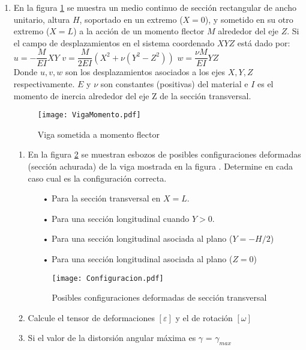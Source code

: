 \documentclass[../notas medios.tex]{subfiles}
\begin{document}
\begin{enumerate}
\item  \label{punto05_d}  En la figura \cref{VigaMomentoflec} se muestra un medio continuo de sección rectangular de ancho unitario, altura $H$, soportado en un extremo ($X = 0$), y sometido en su otro extremo ($X = L$) a la acci\'on de un momento flector $M$ alrededor del eje $Z$. Si el campo de desplazamientos en el sistema coordenado $XYZ$ est\'a dado por: \\

	$u= -\dfrac{M}{EI} X Y $ \hspace*{10mm}	
	$v= \dfrac{M}{2EI}(X^2+ \nu (Y^2-Z^2)) $ \hspace*{10mm}	
	$w= \dfrac{\nu M}{EI} Y Z  $\\


Donde $u,v,w$ son los desplazamientos asociados a los ejes $X,Y,Z$ 
respectivamente. $E$ y $\nu$ son constantes  (positivas) del material e $I$ es 
el momento de inercia alrededor del eje Z de la sección transversal. \\ 
\begin{figure}[H]
	\centering
	\texttt{[image: VigaMomento.pdf]}
	\caption{Viga sometida a momento flector}
	 \label{VigaMomentoflec}
\end{figure}
%
\begin{enumerate}
\item En la figura \cref{ConfiguraFlector} se muestran esbozos de posibles 
configuraciones deformadas (sección achurada) de la viga mostrada en la figura 
\label{VigaMomento}. Determine en cada caso cual es la configuración correcta. 
%
\begin{enumerate}
%
	\item[•] Para la sección transversal en $X = L$. 
	\item[•] Para una sección longitudinal cuando $Y > 0$.
	\item[•]  Para una sección longitudinal asociada al plano ($Y = -H/2$)
	\item[•]  Para una sección longitudinal asociada al plano ($Z = 0$) 
%
\end{enumerate}
%
\begin{figure}[H]
	\centering
	\texttt{[image: Configuracion.pdf]}
	\caption{Posibles configuraciones deformadas de sección transversal}
	\label{ConfiguraFlector}
\end{figure}
%
\item Calcule el tensor de deformaciones  $[\varepsilon]$ y el de rotación $[\omega]$ 
\item Si el valor de la distorsión angular máxima es $\gamma$ = $\gamma_{max}$ 

\end{enumerate}
\end{enumerate}
\end{document}
